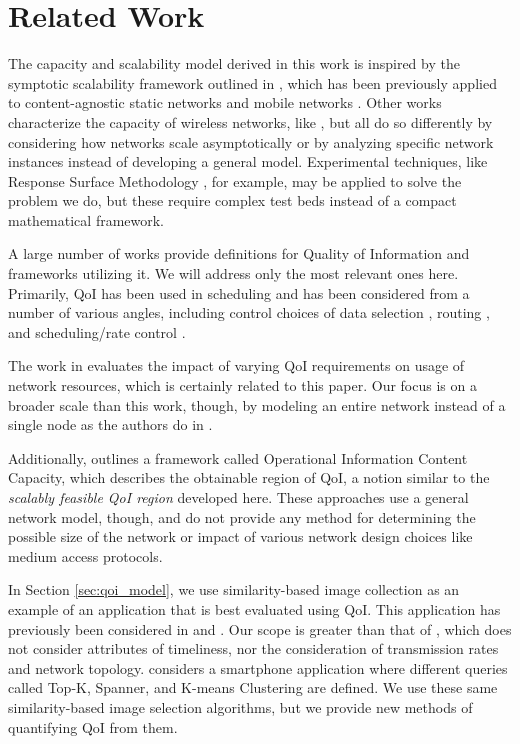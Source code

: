 
\section{Related Work}
\label{sec:related_work}

The capacity and scalability model derived in this work is inspired by the symptotic scalability framework outlined in \cite{symptotics_tech_report}, which has been previously applied to content-agnostic static networks \cite{symptotics_framework_scalability} and mobile networks \cite{scal_analysis_mobility}.  Other works characterize the capacity of wireless networks, like \cite{li_capacity, gupta2000capacity}, but all do so differently by considering how networks scale asymptotically or by analyzing specific network instances instead of developing a general model.  Experimental techniques, like Response Surface Methodology \cite{khuri2010response}, for example, may be applied to solve the problem we do, but these require complex test beds instead of a compact mathematical framework.

A large number of works provide definitions for Quality of Information and frameworks utilizing it.  We will address only the most relevant ones here.  Primarily, QoI has been used in scheduling and has been considered from a number of various angles, including control choices of data selection \cite{dcoss_max_cov}, routing \cite{quality_aware_routing_tan}, and scheduling/rate control \cite{toward_qoi_rate_control,explor_vs_exploit}.

The work in \cite{qoi_aware_mobile_apps} evaluates the impact of varying QoI requirements on usage of network resources, which is certainly related to this paper.  Our focus is on a broader scale than this work, though, by modeling an entire network instead of a single node as the authors do in \cite{qoi_aware_mobile_apps}.

Additionally, \cite{oicc_journal} outlines a framework called Operational Information Content Capacity, which describes the obtainable region of QoI, a notion similar to the \emph{scalably feasible QoI region} developed here.  These approaches use a general network model, though, and do not provide any method for determining the possible size of the network or impact of various network design choices like medium access protocols.   %

In Section \ref{sec:qoi_model}, we use similarity-based image collection as an example of an application that is best evaluated using QoI.  This application has previously been considered in \cite{photonet} and \cite{mediascope}. Our scope is greater than that of \cite{photonet}, which does not consider attributes of timeliness, nor the consideration of transmission rates and network topology.  \cite{mediascope} considers a smartphone application where different queries called Top-K, Spanner, and K-means Clustering are defined.  We use these same similarity-based image selection algorithms, but we provide new methods of quantifying QoI from them.
